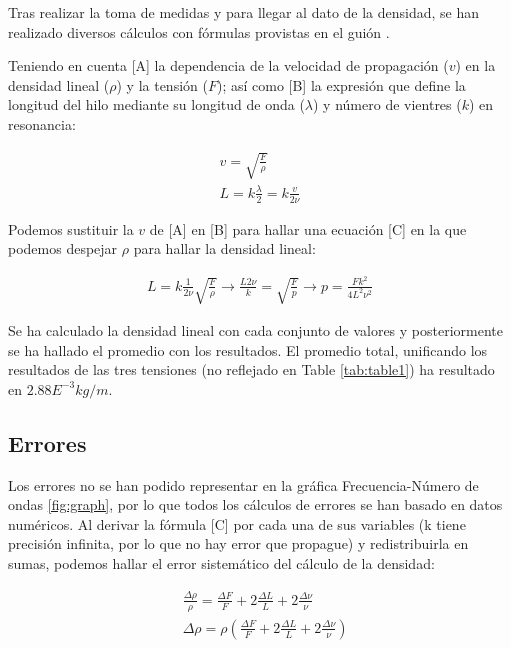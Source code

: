 \documentclass[fleqn,usenatbib,openbib]{mnras}
\begin{document}
Tras realizar la toma de medidas y para llegar al dato de la densidad, se han realizado diversos cálculos con fórmulas provistas en el guión \cite{labuam}.

Teniendo en cuenta [A] la dependencia de la velocidad de propagación ($v$) en la densidad lineal ($\rho$) y la tensión ($F$); así como [B] la expresión que define la longitud del hilo mediante su longitud de onda ($\lambda$) y número de vientres ($k$) en resonancia:

\begin{gather}
v=\sqrt{\frac{F}{\rho}}\\
L=k\frac{\lambda}{2}=k\frac{v}{2\nu}
\end{gather}

Podemos sustituir la $v$ de [A] en [B] para hallar una ecuación [C] en la que podemos despejar $\rho$ para hallar la densidad lineal:

\begin{align}
L=k\frac{1}{2\nu}\sqrt{\frac{F}{\rho}}\rightarrow
\frac{L2\nu}{k}=\sqrt{\frac{F}{p}}\rightarrow
p=\frac{Fk^{2}}{4L^{2}\nu^{2}}
\end{align}

Se ha calculado la densidad lineal con cada conjunto de valores y posteriormente se ha hallado el promedio con los resultados. El promedio total, unificando los resultados de las tres tensiones (no reflejado en Table \cref{tab:table1}) ha resultado en $\boxed{2.88E^{-3} kg/m}$.



\subsection{Errores}

Los errores no se han podido representar en la gráfica Frecuencia-Número de ondas \cref{fig:graph}, por lo que todos los cálculos de errores se han basado en datos numéricos. Al derivar la fórmula [C] por cada una de sus variables (k tiene precisión infinita, por lo que no hay error que propague) y redistribuirla en sumas, podemos hallar el error sistemático del cálculo de la densidad:

\begin{align}
%
& \frac{\Delta\rho}{\rho} = \frac{\Delta F}{F} + 2\frac{\Delta L}{L} + 2\frac{\Delta\nu}{\nu}\\
& \Delta\rho = \rho(\frac{\Delta F}{F} + 2\frac{\Delta L}{L} + 2\frac{\Delta\nu}{\nu})
%
\end{align}
\end{document}

